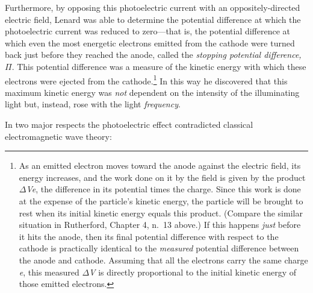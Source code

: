 Furthermore, by opposing this photoelectric current with an
oppositely-directed electric field, Lenard was able to determine the
potential difference at which the photoelectric current was reduced to
zero---that is, the potential difference at which even the most
energetic electrons emitted from the cathode were turned back just
before they reached the anode, called the \emph{stopping potential
difference,} $\Pi$. This potential difference was a measure of the
kinetic energy with which these electrons were ejected from the
cathode.\footnote{As an emitted electron moves toward the anode against
  the electric field, its energy increases, and the work done on it by
  the field is given by the product $\Delta$\emph{Ve}, the difference in its
  potential times the charge. Since this work is done at the expense of
  the particle's kinetic energy, the particle will be brought to rest
  when its initial kinetic energy equals this product. (Compare the
  similar situation in Rutherford, Chapter 4, n.\ 13 above.) If this happens
  \emph{just} before it hits the anode, then its final potential
  difference with respect to the cathode is practically identical to the
  \emph{measured} potential difference between the anode and cathode.
  Assuming that all the electrons carry the same charge \emph{e}, this
  measured $\Delta$\emph{V} is directly proportional to the initial kinetic
  energy of those emitted electrons.} In this way he discovered that
this maximum kinetic energy was \emph{not} dependent on the intensity of
the illuminating light but, instead, rose with the light
\emph{frequency}.

In two major respects the photoelectric effect contradicted classical
electromagnetic wave theory:

